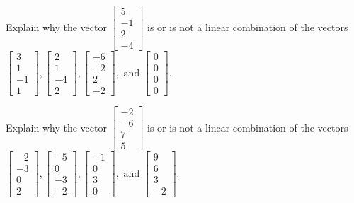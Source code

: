 \documentclass{article}
\begin{document}
\begin{exerciseStatement}
    Explain why the vector \(\left[\begin{array}{c}
5 \\
-1 \\
2 \\
-4
\end{array}\right]\)  is or is not a linear
combination of the vectors \(\left[\begin{array}{c}
3 \\
1 \\
-1 \\
1
\end{array}\right] , \left[\begin{array}{c}
2 \\
1 \\
-4 \\
2
\end{array}\right] , \left[\begin{array}{c}
-6 \\
-2 \\
2 \\
-2
\end{array}\right] , \text{ and } \left[\begin{array}{c}
0 \\
0 \\
0 \\
0
\end{array}\right]\).



  
\end{exerciseStatement}

\begin{exerciseStatement}
    Explain why the vector \(\left[\begin{array}{c}
-2 \\
-6 \\
7 \\
5
\end{array}\right]\)  is or is not a linear
combination of the vectors \(\left[\begin{array}{c}
-2 \\
-3 \\
0 \\
2
\end{array}\right] , \left[\begin{array}{c}
-5 \\
0 \\
-3 \\
-2
\end{array}\right] , \left[\begin{array}{c}
-1 \\
0 \\
3 \\
0
\end{array}\right] , \text{ and } \left[\begin{array}{c}
9 \\
6 \\
3 \\
-2
\end{array}\right]\).



  
\end{exerciseStatement}
\end{document}

